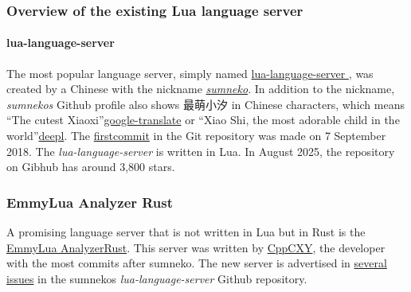 \documentclass{ltxdoc}
\begin{document}
\subsubsection{Overview of the existing Lua language server}

\paragraph{lua-language-server}

The most popular language server, simply named
\href{https://github.com/LuaLS/lua-language-server}{lua-language-server
}, was created by a Chinese with the nickname
\href{https://github.com/sumneko}{\emph{sumneko}}. In addition to the
nickname, \emph{sumnekos} Github profile also shows 最萌小汐 in Chinese
characters, which means “The cutest
Xiaoxi”\href{https://translate.google.de/?sl=zh-CN&tl=en&text=\%E6\%9C\%80
\%E8\%90\%8C\%E5\%B0\%8F\%E6\%B1\%90\%20&op=translate}{google-translate} or
“Xiao Shi, the most adorable child in the
world”\href{https://www.deepl.com/en/translator#zh/en-gb/\%E6\%9C\%80\%E8\%9
0\%8C\%E5\%B0\%8F\%E6\%B1\%90}{deepl}. The
\href{https://github.com/LuaLS/lua-language-server/commit/3546129c29fbf
d7211099a3fbee03a763915ab58}{firstcommit} in the Git repository was
made on 7 September 2018. The \emph{lua-language-server} is written in
Lua. In August 2025, the repository on Gibhub has around 3,800 stars.

\subsubsection{EmmyLua Analyzer Rust}

A promising language server that is not written in Lua but in Rust is
the \href{https://github.com/EmmyLuaLs/emmylua-analyzer-rust}{EmmyLua
AnalyzerRust}. This server was written by
\href{https://github.com/CppCXY}{CppCXY}, the developer with the most
commits after sumneko. The new server is advertised in
\href{https://github.com/LuaLS/lua-language-server/issues/2910}{several
}
\href{https://github.com/LuaLS/lua-language-server/issues/3017}{issues}
in the sumnekos \emph{lua-language-server} Github repository.
\end{document}
